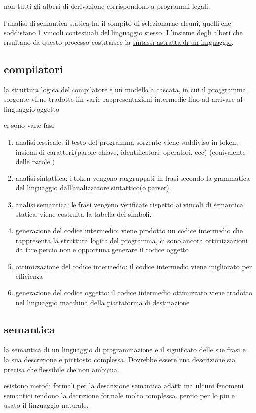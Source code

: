 \documentclass[12pt]{article}
\begin{document}
non tutti gli alberi di derivazione corrispondono a programmi legali.

l'analisi di semantica statica ha il compito di selezionarne alcuni, quelli
che soddisfano 1 vincoli contestuali del linguaggio stesso. L'insieme degli alberi
che risultano da questo processo costituisce la \underline{sintassi astratta di un linguaggio}.

\subsection{compilatori}
la struttura logica del compilatore e un modello a cascata, in cui il proggramma sorgente viene tradotto iin varie rappresentazioni intermedie
fino ad arrivare al linguaggio oggetto

ci sono varie fasi
\begin{enumerate}
    \item analisi lessicale: il testo del programma sorgente viene suddiviso in token, insiemi di caratteri.(parole chiave, identificatori, operatori, ecc) (equivalente delle parole.)
    \item analisi sintattica: i token vengono raggruppati in frasi secondo la grammatica del linguaggio dall'analizzatore sintattico(o parser).
    \item analisi semantica: le frasi vengono verificate rispetto ai vincoli di semantica statica. viene costruita la tabella dei simboli.
    \item generazione del codice intermedio: viene prodotto un codice intermedio che rappresenta la struttura logica del programma, ci sono ancora ottimizzazioni da fare percio non e opportuna generare il codice oggetto
    \item ottimizzazione del codice intermedio: il codice intermedio viene migliorato per efficienza
    \item generazione del codice oggetto: il codice intermedio ottimizzato viene tradotto nel linguaggio macchina della piattaforma di destinazione
\end{enumerate}

\subsection{semantica}
la semantica di un linguaggio di programmazione e il significato delle sue frasi e la sua descrizione e piuttosto complessa.
Dovrebbe essere una descrizione sia precisa che flessibile che non ambigua.

esistono metodi formali per la descrizione semantica adatti ma ulcuni fenomeni semantici rendono la decrizione formale molto complessa.
percio per lo piu e usato il linguaggio naturale.
\end{document}
